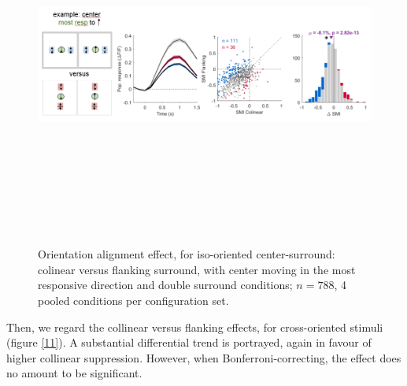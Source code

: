 \begin{figure}[H] \centering \includegraphics[width=12cm,height=12cm,keepaspectratio]{Figures/7.Results/finalPopulation/sel/diagrams/10.png} 
\caption{Orientation alignment effect, for iso-oriented center-surround: colinear versus flanking surround, with center moving in the most responsive direction and double surround conditions;  $n=788$, 4 pooled conditions per configuration set.} \label{10} 
\end{figure}

Then, we regard the collinear versus flanking effects, for cross-oriented stimuli (figure \ref{11}). A substantial differential trend is portrayed, again in favour of higher collinear suppression. However, when Bonferroni-correcting, the effect does no amount to be significant.

